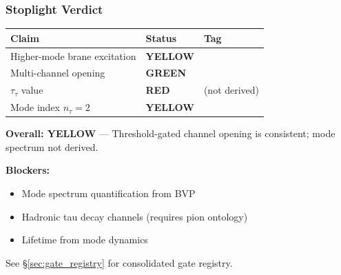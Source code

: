 \subsubsection{Stoplight Verdict}
\label{subsec:tau_stoplight}

\begin{tcolorbox}[colback=yellow!10!white, colframe=orange!60!black,
    title=\textbf{Case Tau: Stoplight Verdict}]

\begin{center}
\begin{tabular}{@{}lll@{}}
\toprule
\textbf{Claim} & \textbf{Status} & \textbf{Tag} \\
\midrule
Higher-mode brane excitation & \textcolor{YellowOrange}{\textbf{YELLOW}} & \tagP{} \\
Multi-channel opening & \textcolor{OliveGreen}{\textbf{GREEN}} & \tagDc{} \\
$\tau_\tau$ value & \textcolor{BrickRed}{\textbf{RED}} & \tagBL{} (not derived) \\
Mode index $n_\tau = 2$ & \textcolor{YellowOrange}{\textbf{YELLOW}} & \tagI{} \\
\bottomrule
\end{tabular}
\end{center}

\textbf{Overall: YELLOW} --- Threshold-gated channel opening is consistent;
mode spectrum not derived.

\textbf{Blockers:}
\begin{itemize}[nosep]
\item Mode spectrum quantification from BVP
\item Hadronic tau decay channels (requires pion ontology)
\item Lifetime from mode dynamics
\end{itemize}

See \S\ref{sec:gate_registry} for consolidated gate registry.
\end{tcolorbox}


